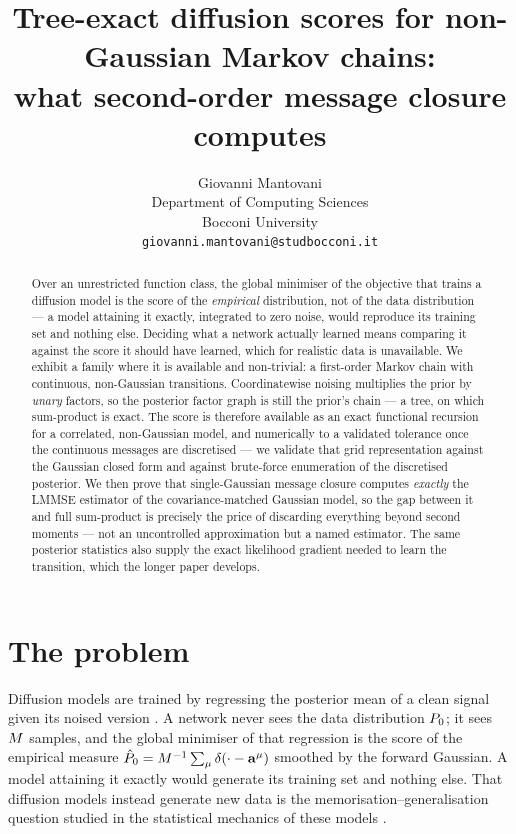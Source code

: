 \documentclass{article}
\title{Tree-exact diffusion scores for non-Gaussian Markov chains:\\
what second-order message closure computes}
\author{%
  Giovanni Mantovani \\
  Department of Computing Sciences \\
  Bocconi University \\
  \texttt{giovanni.mantovani@studbocconi.it}
}
\theoremstyle{definition}
\theoremstyle{plain}
\begin{document}
\maketitle

\begin{abstract}
Over an unrestricted function class, the global minimiser of the objective that trains a diffusion
model is the score of the \emph{empirical} distribution, not of the data distribution --- a model
attaining it exactly, integrated to zero noise, would reproduce its training set and nothing
else. Deciding what a network actually learned means
comparing it against the score it should have learned, which for realistic data is unavailable.
We exhibit a family where it is available and non-trivial: a first-order Markov chain with
continuous, non-Gaussian transitions. Coordinatewise noising multiplies the prior by \emph{unary}
factors, so the posterior factor graph is still the prior's chain --- a tree, on which sum-product
is exact. The score is therefore available as an exact functional recursion for a correlated,
non-Gaussian model, and numerically to a validated tolerance once the continuous messages are
discretised --- we validate that grid representation against the Gaussian closed form and against
brute-force enumeration of the discretised posterior. We then prove that single-Gaussian
message closure computes \emph{exactly} the LMMSE estimator of the covariance-matched Gaussian
model, so the gap between it and full sum-product is precisely the price of discarding everything
beyond second moments --- not an uncontrolled approximation but a named estimator. The same
posterior statistics also supply the exact likelihood gradient needed to learn the transition,
which the longer paper develops.
\end{abstract}

\section{The problem}

Diffusion models are trained by regressing the posterior mean of a clean signal given its noised
version \citep{sohl2015deep,ho2020denoising,song2021scorebased,vincent2011connection}. A network never sees the data distribution
$P_0$; it sees $M$ samples, and the global minimiser of that regression is the score of the
empirical measure $\hat P_0 = M^{-1}\sum_\mu\delta(\cdot-\mathbf{a}^\mu)$ smoothed by the forward
Gaussian. A model attaining it exactly would generate its training set and nothing else. That
diffusion models instead generate new data is the memorisation--generalisation question studied in
the statistical mechanics of these models \citep{biroli2023generative,biroli2024dynamical}.
\end{document}
